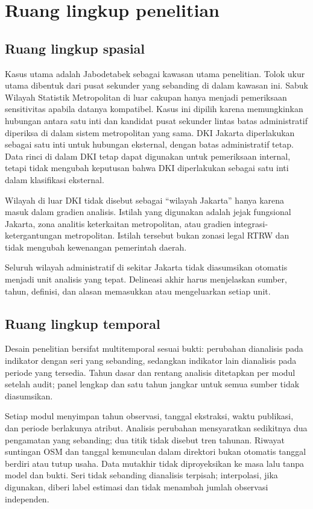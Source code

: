 \documentclass[11pt,a4paper,oneside,openany,indonesian]{report}
\begin{document}
\section{Ruang lingkup penelitian}\label{ruang-lingkup-penelitian}

\subsection{Ruang lingkup spasial}\label{ruang-lingkup-spasial}

Kasus utama adalah Jabodetabek sebagai kawasan utama penelitian. Tolok
ukur utama dibentuk dari pusat sekunder yang sebanding di dalam kawasan
ini. Sabuk Wilayah Statistik Metropolitan di luar cakupan hanya menjadi
pemeriksaan sensitivitas apabila datanya kompatibel. Kasus ini dipilih karena memungkinkan
hubungan antara satu inti dan kandidat pusat sekunder lintas batas
administratif diperiksa di dalam sistem metropolitan yang sama. DKI
Jakarta diperlakukan sebagai satu inti untuk hubungan eksternal, dengan
batas administratif tetap. Data rinci di dalam DKI tetap dapat digunakan
untuk pemeriksaan internal, tetapi tidak mengubah keputusan bahwa DKI
diperlakukan sebagai satu inti dalam klasifikasi eksternal.

Wilayah di luar DKI tidak disebut sebagai ``wilayah Jakarta'' hanya
karena masuk dalam gradien analisis. Istilah yang digunakan adalah
jejak fungsional Jakarta, zona analitis keterkaitan metropolitan, atau
gradien integrasi-ketergantungan metropolitan. Istilah tersebut bukan zonasi legal RTRW dan tidak
mengubah kewenangan pemerintah daerah.

Seluruh wilayah administratif di sekitar Jakarta tidak diasumsikan
otomatis menjadi unit analisis yang tepat. Delineasi akhir harus
menjelaskan sumber, tahun, definisi, dan alasan memasukkan atau
mengeluarkan setiap unit.

\subsection{Ruang lingkup temporal}\label{ruang-lingkup-temporal}

Desain penelitian bersifat multitemporal sesuai bukti: perubahan
dianalisis pada indikator dengan seri yang sebanding, sedangkan
indikator lain dianalisis pada periode yang tersedia. Tahun dasar dan
rentang analisis ditetapkan per modul setelah audit; panel lengkap dan
satu tahun jangkar untuk semua sumber tidak diasumsikan.

Setiap modul menyimpan tahun observasi, tanggal ekstraksi, waktu
publikasi, dan periode berlakunya atribut. Analisis perubahan
mensyaratkan sedikitnya dua pengamatan yang sebanding; dua titik tidak
disebut tren tahunan. Riwayat suntingan OSM dan tanggal kemunculan dalam
direktori bukan otomatis tanggal berdiri atau tutup usaha. Data mutakhir
tidak diproyeksikan ke masa lalu tanpa model dan bukti. Seri tidak
sebanding dianalisis terpisah; interpolasi, jika digunakan, diberi label
estimasi dan tidak menambah jumlah observasi independen.
\end{document}
